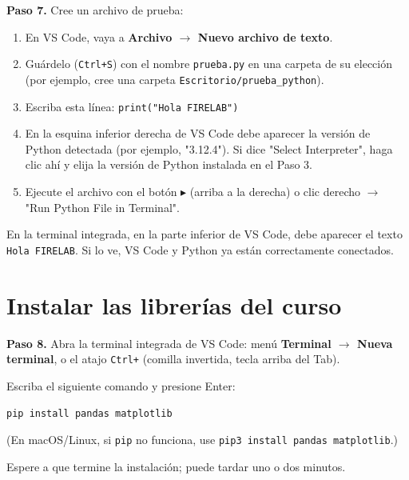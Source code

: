 \documentclass[11pt,a4paper]{article}
\newcommand{\code}[1]{\texttt{#1}}
\begin{document}
\begin{stepbox}
\textbf{Paso 7.} Cree un archivo de prueba:
\begin{enumerate}
  \item En VS Code, vaya a \textbf{Archivo $\to$ Nuevo archivo de texto}.
  \item Guárdelo (\code{Ctrl+S}) con el nombre \code{prueba.py} en una carpeta de su elección (por ejemplo, cree una carpeta \code{Escritorio/prueba\_python}).
  \item Escriba esta línea: \code{print("Hola FIRELAB")}
  \item En la esquina inferior derecha de VS Code debe aparecer la versión de Python detectada (por ejemplo, "3.12.4"). Si dice "Select Interpreter", haga clic ahí y elija la versión de Python instalada en el Paso 3.
  \item Ejecute el archivo con el botón $\blacktriangleright$ (arriba a la derecha) o clic derecho $\to$ "Run Python File in Terminal".
\end{enumerate}
\end{stepbox}

\begin{verify}
En la terminal integrada, en la parte inferior de VS Code, debe aparecer el texto \code{Hola FIRELAB}. Si lo ve, VS Code y Python ya están correctamente conectados.
\end{verify}

\section{Instalar las librerías del curso}

\begin{stepbox}
\textbf{Paso 8.} Abra la terminal integrada de VS Code: menú \textbf{Terminal $\to$ Nueva terminal}, o el atajo \code{Ctrl+\textasciigrave} (comilla invertida, tecla arriba del Tab).

Escriba el siguiente comando y presione Enter:
\begin{center}\code{pip install pandas matplotlib}\end{center}
(En macOS/Linux, si \code{pip} no funciona, use \code{pip3 install pandas matplotlib}.)

Espere a que termine la instalación; puede tardar uno o dos minutos.
\end{stepbox}
\end{document}
